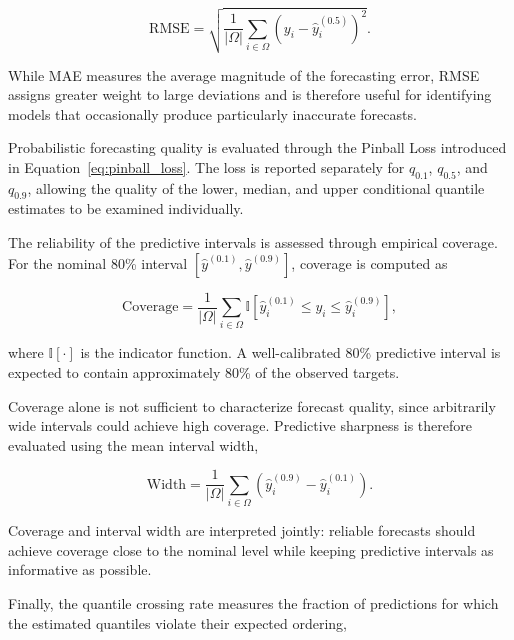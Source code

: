\begin{equation}
    \mathrm{RMSE}
    =
    \sqrt{
        \frac{1}{|\Omega|}
        \sum_{i\in\Omega}
        \left(
            y_i-\hat{y}^{(0.5)}_i
        \right)^2
    }.
    \label{eq:rmse}
\end{equation}

While MAE measures the average magnitude of the forecasting error, RMSE
assigns greater weight to large deviations and is therefore useful for
identifying models that occasionally produce particularly inaccurate
forecasts.

Probabilistic forecasting quality is evaluated through the Pinball Loss
introduced in Equation~\ref{eq:pinball_loss}. The loss is reported
separately for $q_{0.1}$, $q_{0.5}$, and $q_{0.9}$, allowing the quality of
the lower, median, and upper conditional quantile estimates to be examined
individually.

The reliability of the predictive intervals is assessed through empirical
coverage. For the nominal 80\% interval
$[\hat{y}^{(0.1)},\hat{y}^{(0.9)}]$, coverage is computed as

\begin{equation}
    \mathrm{Coverage}
    =
    \frac{1}{|\Omega|}
    \sum_{i\in\Omega}
    \mathbb{I}
    \left[
        \hat{y}^{(0.1)}_i
        \leq y_i
        \leq
        \hat{y}^{(0.9)}_i
    \right],
    \label{eq:coverage}
\end{equation}

where $\mathbb{I}[\cdot]$ is the indicator function. A well-calibrated
80\% predictive interval is expected to contain approximately 80\% of the
observed targets.

Coverage alone is not sufficient to characterize forecast quality, since
arbitrarily wide intervals could achieve high coverage. Predictive sharpness
is therefore evaluated using the mean interval width,

\begin{equation}
    \mathrm{Width}
    =
    \frac{1}{|\Omega|}
    \sum_{i\in\Omega}
    \left(
        \hat{y}^{(0.9)}_i
        -
        \hat{y}^{(0.1)}_i
    \right).
    \label{eq:interval_width}
\end{equation}

Coverage and interval width are interpreted jointly: reliable forecasts
should achieve coverage close to the nominal level while keeping predictive
intervals as informative as possible.

Finally, the quantile crossing rate measures the fraction of predictions for
which the estimated quantiles violate their expected ordering,

